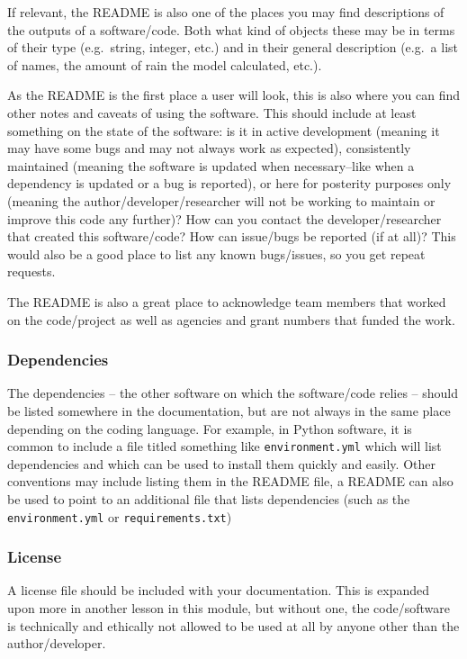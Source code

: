 \documentclass[
  letterpaper,
  DIV=11,
  numbers=noendperiod]{scrreport}
\begin{document}
If relevant, the README is also one of the places you may find
descriptions of the outputs of a software/code. Both what kind of
objects these may be in terms of their type (e.g.~string, integer, etc.)
and in their general description (e.g.~a list of names, the amount of
rain the model calculated, etc.).

As the README is the first place a user will look, this is also where
you can find other notes and caveats of using the software. This should
include at least something on the state of the software: is it in active
development (meaning it may have some bugs and may not always work as
expected), consistently maintained (meaning the software is updated when
necessary--like when a dependency is updated or a bug is reported), or
here for posterity purposes only (meaning the
author/developer/researcher will not be working to maintain or improve
this code any further)? How can you contact the developer/researcher
that created this software/code? How can issue/bugs be reported (if at
all)? This would also be a good place to list any known bugs/issues, so
you get repeat requests.

The README is also a great place to acknowledge team members that worked
on the code/project as well as agencies and grant numbers that funded
the work.

\hypertarget{dependencies}{%
\subsubsection{Dependencies}\label{dependencies}}

The dependencies -- the other software on which the software/code relies
-- should be listed somewhere in the documentation, but are not always
in the same place depending on the coding language. For example, in
Python software, it is common to include a file titled something like
\texttt{environment.yml} which will list dependencies and which can be
used to install them quickly and easily. Other conventions may include
listing them in the README file, a README can also be used to point to
an additional file that lists dependencies (such as the
\texttt{environment.yml} or \texttt{requirements.txt})

\hypertarget{license}{%
\subsubsection{License}\label{license}}

A license file should be included with your documentation. This is
expanded upon more in another lesson in this module, but without one,
the code/software is technically and ethically not allowed to be used at
all by anyone other than the author/developer.
\end{document}
